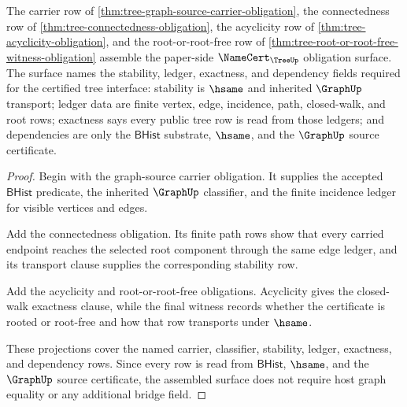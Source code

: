 \begin{theorem}
\label{thm:tree-namecert-obligation-surface}
The carrier row of
\autoref{thm:tree-graph-source-carrier-obligation}, the connectedness row of
\autoref{thm:tree-connectedness-obligation}, the acyclicity row of
\autoref{thm:tree-acyclicity-obligation}, and the root-or-root-free row of
\autoref{thm:tree-root-or-root-free-witness-obligation} assemble the
paper-side $\NameCert_{\TreeUp}$ obligation surface. The surface names the
stability, ledger, exactness, and dependency fields required for the certified
tree interface: stability is $\hsame$ and inherited $\GraphUp$ transport;
ledger data are finite vertex, edge, incidence, path, closed-walk, and root
rows; exactness says every public tree row is read from those ledgers; and
dependencies are only the $\mathsf{BHist}$ substrate, $\hsame$, and the
$\GraphUp$ source certificate.
\end{theorem}
\begin{proof}
Begin with the graph-source carrier obligation. It supplies the accepted
$\mathsf{BHist}$ predicate, the inherited $\GraphUp$ classifier, and the
finite incidence ledger for visible vertices and edges.

Add the connectedness obligation. Its finite path rows show that every
carried endpoint reaches the selected root component through the same edge
ledger, and its transport clause supplies the corresponding stability row.

Add the acyclicity and root-or-root-free obligations. Acyclicity gives the
closed-walk exactness clause, while the final witness records whether the
certificate is rooted or root-free and how that row transports under
$\hsame$.

These projections cover the named carrier, classifier, stability, ledger,
exactness, and dependency rows. Since every row is read from
$\mathsf{BHist}$, $\hsame$, and the $\GraphUp$ source certificate, the
assembled surface does not require host graph equality or any additional
bridge field.
\end{proof}

